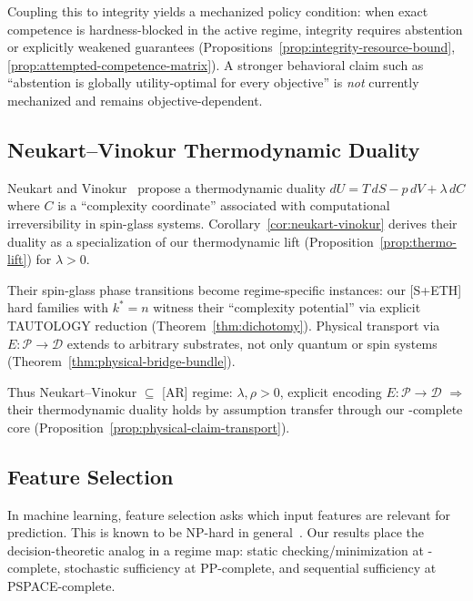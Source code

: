 Coupling this to integrity yields a mechanized policy condition: when exact competence is hardness-blocked in the active regime, integrity requires abstention or explicitly weakened guarantees (Propositions~\ref{prop:integrity-resource-bound}, \ref{prop:attempted-competence-matrix}). A stronger behavioral claim such as ``abstention is globally utility-optimal for every objective'' is \emph{not} currently mechanized and remains objective-dependent.

\subsection{Neukart--Vinokur Thermodynamic Duality}

Neukart and Vinokur~\cite{neukart2025thermodynamic} propose a thermodynamic duality $dU = T\,dS - p\,dV + \lambda\,dC$ where $C$ is a ``complexity coordinate'' associated with computational irreversibility in spin-glass systems. Corollary~\ref{cor:neukart-vinokur} derives their duality as a specialization of our thermodynamic lift (Proposition~\ref{prop:thermo-lift}) for $\lambda > 0$.

Their spin-glass phase transitions become regime-specific instances: our [S+ETH] hard families with $k^* = n$ witness their ``complexity potential'' via explicit TAUTOLOGY reduction (Theorem~\ref{thm:dichotomy}). Physical transport via $E:\mathcal{P}\to\mathcal{D}$ extends to arbitrary substrates, not only quantum or spin systems (Theorem~\ref{thm:physical-bridge-bundle}).

Thus Neukart--Vinokur $\subseteq$ [AR] regime: $\lambda,\rho > 0$, explicit encoding $E:\mathcal{P}\to\mathcal{D}$ $\Rightarrow$ their thermodynamic duality holds by assumption transfer through our \coNP-complete core (Proposition~\ref{prop:physical-claim-transport}).

\subsection{Feature Selection}

In machine learning, feature selection asks which input features are relevant for prediction. This is known to be NP-hard in general~\cite{blum1997selection, guyon2003introduction}. Our results place the decision-theoretic analog in a regime map: static checking/minimization at \coNP-complete, stochastic sufficiency at PP-complete, and sequential sufficiency at PSPACE-complete.

